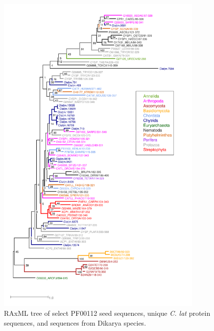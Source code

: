 \begin{figure}[tbp]
  \includegraphics[width=4in]{./Chapter_Coelomomyces/img/PF00112_tree.png}
  \caption[PF00112 RAxML tree]{RAxML tree of select PF00112 seed sequences, unique \textit{C. lat} protein sequences, and sequences from Dikarya species.}
  \label{fig:ChClat_PF00112}
\end{figure}

